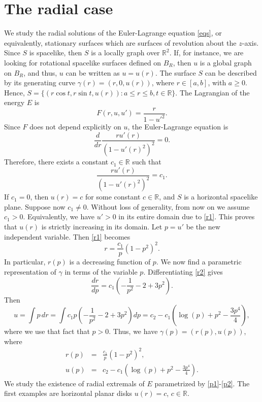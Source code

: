 \documentclass[a4paper,12pt]{amsart}
\theoremstyle{definition}
\def\r{\mathbb R}
\begin{document}
\section{The radial case}\label{s5}

We study the radial solutions of the Euler-Lagrange equation \eqref{eqs}, or equivalently,   stationary surfaces  which are surfaces of revolution about the $z$-axis. Since $S$ is spacelike, then $S$ is a locally graph over $\r^2$. If, for instance, we are looking for rotational spacelike surfaces defined on $B_R$, then $u$ is a global graph on $B_R$, and thus, $u$ can be written as $u=u(r)$. The surface $S$   can be described by its generating curve $\gamma(r)=(r,0,u(r))$, where 
$r\in [a,b]$, with  $a\geq 0$. Hence, $S=\{(r\cos t, r\sin t,u(r))\colon a\leq r\leq b,t\in\r\}$. The Lagrangian of the energy $E$ is 
\begin{equation}\label{ff}
F(r,u,u')=\frac{r}{1-u'^2}.
\end{equation}
Since $F$ does not depend explicitly on $u$, the Euler-Lagrange equation is  
$$\frac{d}{dr}\frac{ru'(r)}{(1-u'(r)^2)^2}=0.$$
Therefore, there exists  a constant $c_1\in\r$ such that 
\begin{equation}\label{r1}
\frac{ru'(r)}{(1-u'(r)^2)^2}=c_1.
\end{equation}
 If $c_1=0$, then $u(r)=c$ for some constant $c\in\r$, and $S$ is a horizontal spacelike plane. Suppose now $c_1\not=0$. Without loss of generality, from now on we assume $c_1>0$.  Equivalently, we have $u'>0$ in its entire domain due to \eqref{r1}. This proves that $u(r)$ is strictly increasing in its domain. Let $p=u'$ be the new independent variable.   Then \eqref{r1} becomes
\begin{equation}\label{r2}
r= \frac{c_1}{p}(1-p^2)^2.
\end{equation}
In particular, $r(p)$ is a decreasing function of $p$. 
We now find a parametric representation of $\gamma$ in terms of the variable $p$. Differentiating   \eqref{r2} gives 
$$\frac{dr}{dp}=c_1 (-\frac{1}{p^2}-2+3p^2).$$
Then
$$u=\int p\, dr= \int c_1 p\left(-\frac{1}{p^2}-2+3p^2\right)dp=c_2- c_1 \left(\log(p)+p^2-\frac{3p^4}{4}\right),$$
where we use  that fact that $p>0$. 
Thus, we  have $\gamma(p)=(r(p),u(p))$, where 
\begin{eqnarray}
r(p)&=&\frac{c_1}{p}(1-p^2)^2,\label{p1}\\
u(p)&=&c_2-c_1\left(\log(p)+p^2-\frac{3p^4}{4}\right).\label{p2}
\end{eqnarray}
We study the existence of radial extremals of $E$ parametrized by \eqref{p1}-\eqref{p2}. The first examples are horizontal planar disks $u(r)=c$, $c\in\r$. 
\end{document}

